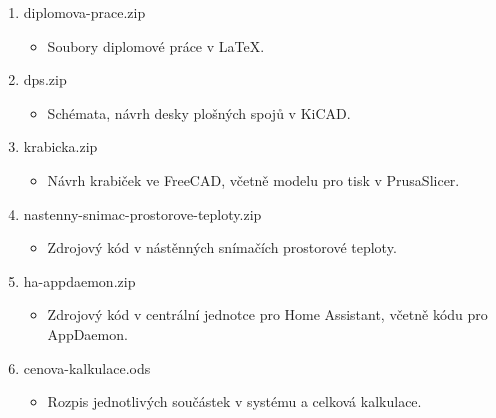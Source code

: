\begin{enumerate}
  \item diplomova-prace.zip
  \begin{itemize}
     	\item Soubory diplomové práce v \LaTeX.
  	\end{itemize}
  \item dps.zip 
  	\begin{itemize}
     	\item Schémata, návrh desky plošných spojů v KiCAD.
  	\end{itemize}
  \item krabicka.zip
  	\begin{itemize}
     	\item Návrh krabiček ve FreeCAD, včetně modelu pro tisk v PrusaSlicer.
   	\end{itemize}
   \item nastenny-snimac-prostorove-teploty.zip
  		\begin{itemize}
     		\item Zdrojový kód v nástěnných snímačích prostorové teploty.
   		\end{itemize}
   	\item ha-appdaemon.zip
  		\begin{itemize}
     		\item Zdrojový kód v centrální jednotce pro Home Assistant, včetně kódu pro AppDaemon.
   		\end{itemize}
   	\item cenova-kalkulace.ods
  		\begin{itemize}
     		\item Rozpis jednotlivých součástek v systému a celková kalkulace.
   		\end{itemize}
\end{enumerate}